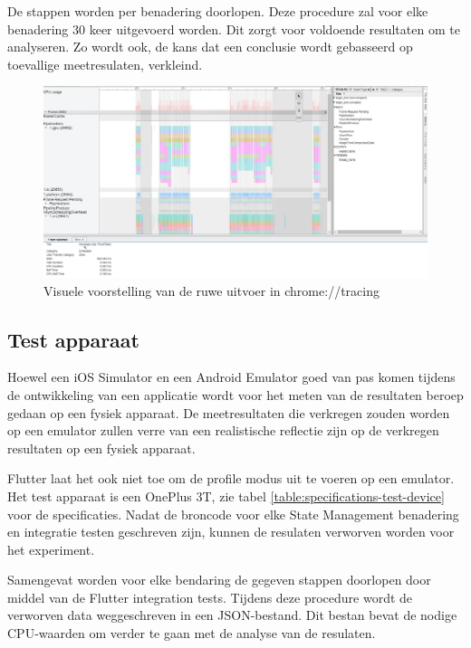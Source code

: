 De stappen worden per benadering doorlopen. Deze procedure zal voor elke benadering 30 keer uitgevoerd worden. Dit zorgt voor voldoende resultaten om te analyseren. Zo wordt ook, de kans dat een conclusie wordt gebasseerd op toevallige meetresulaten, verkleind.

\begin{figure}[H]
    \includegraphics[width=\linewidth]{img/methodologie/chrome-tracing-timeline.jpg}
    \caption{Visuele voorstelling van de ruwe uitvoer in chrome://tracing}
    \label{fig:chrome-tracing-timeline}
\end{figure}


\subsection{Test apparaat}
Hoewel een iOS Simulator en een Android Emulator goed van pas komen tijdens de ontwikkeling van een applicatie wordt voor het meten van de resultaten beroep gedaan op een fysiek apparaat. De meetresultaten die verkregen zouden worden op een emulator zullen verre van een realistische reflectie zijn op de verkregen resultaten op een fysiek apparaat. \autocite{Flutter2019c}

Flutter laat het ook niet toe om de profile modus uit te voeren op een emulator.
Het test apparaat is een OnePlus 3T, zie tabel \ref{table:specifications-test-device} voor de specificaties.
Nadat de broncode voor elke State Management benadering en integratie testen geschreven zijn, kunnen de resulaten verworven worden voor het experiment.

Samengevat worden voor elke bendaring de gegeven stappen doorlopen door middel van de Flutter integration tests. Tijdens deze procedure wordt de verworven data weggeschreven in een JSON-bestand. Dit bestan bevat de nodige CPU-waarden om verder te gaan met de analyse van de resulaten.

